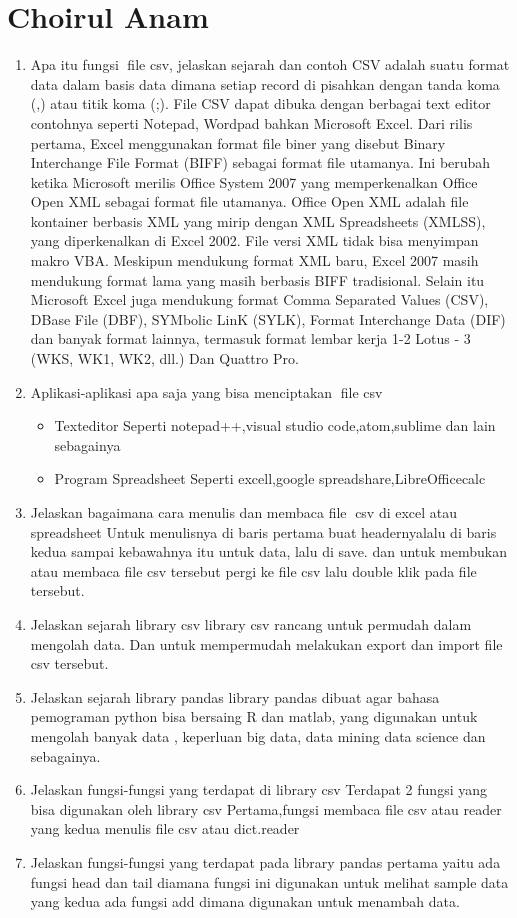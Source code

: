 \section{Choirul Anam}
\begin{enumerate}
    \item Apa itu fungsi file csv, jelaskan sejarah dan contoh
    CSV adalah suatu format data dalam basis data dimana setiap record di pisahkan dengan tanda koma (,) atau titik koma (;). File CSV dapat dibuka dengan berbagai text editor contohnya seperti Notepad, Wordpad bahkan Microsoft Excel.
    Dari rilis pertama, Excel menggunakan format file biner yang disebut Binary Interchange File Format (BIFF) sebagai format file utamanya. Ini berubah ketika Microsoft merilis Office System 2007 yang memperkenalkan Office Open XML sebagai format file utamanya. Office Open XML adalah file kontainer berbasis XML yang mirip dengan XML Spreadsheets (XMLSS), yang diperkenalkan di Excel 2002. File versi XML tidak bisa menyimpan makro VBA.
    Meskipun mendukung format XML baru, Excel 2007 masih mendukung format lama yang masih berbasis BIFF tradisional. Selain itu Microsoft Excel juga mendukung format Comma Separated Values (CSV), DBase File (DBF), SYMbolic LinK (SYLK), Format Interchange Data (DIF) dan banyak format lainnya, termasuk format lembar kerja 1-2 Lotus - 3 (WKS, WK1, WK2, dll.) Dan Quattro Pro.
    \item Aplikasi-aplikasi apa saja yang bisa menciptakan file csv
    \begin{itemize}
        \item Texteditor
        Seperti notepad++,visual studio code,atom,sublime dan lain sebagainya
        \item Program Spreadsheet
        Seperti excell,google spreadshare,LibreOfficecalc
    \end{itemize}
    \item Jelaskan bagaimana cara menulis dan membaca file csv di excel atau spreadsheet
    Untuk menulisnya di baris pertama buat headernyalalu di baris kedua sampai kebawahnya itu untuk data, lalu di save.
    dan untuk membukan atau membaca file csv tersebut pergi ke file csv lalu double klik pada file tersebut.
    \item Jelaskan sejarah library csv
    library csv rancang untuk permudah dalam mengolah data. Dan untuk mempermudah melakukan export dan import file csv tersebut.
    \item Jelaskan sejarah library pandas
    library pandas dibuat agar bahasa pemograman python bisa bersaing R dan matlab, yang digunakan untuk mengolah banyak data , keperluan big data, data mining data science dan sebagainya.
    \item Jelaskan fungsi-fungsi yang terdapat di library csv
    Terdapat 2 fungsi yang bisa digunakan oleh library csv
    Pertama,fungsi membaca file csv atau reader
    yang kedua menulis file csv atau dict.reader
   \item Jelaskan fungsi-fungsi yang terdapat pada library pandas
   pertama yaitu ada fungsi head dan tail diamana fungsi ini digunakan untuk melihat sample data
   yang kedua ada fungsi add dimana digunakan untuk menambah data. 
\end{enumerate}
